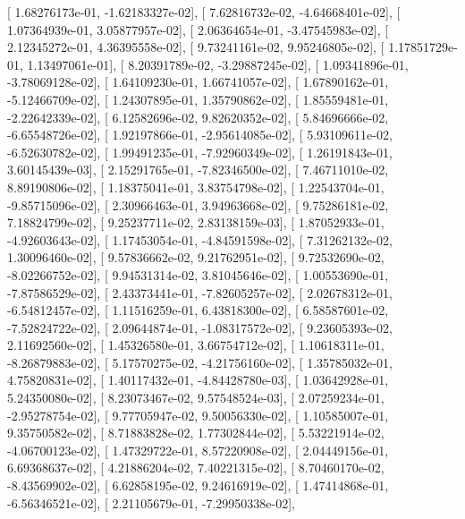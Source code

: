 \documentclass{article}
\begin{document}
       [  1.68276173e-01,  -1.62183327e-02],
       [  7.62816732e-02,  -4.64668401e-02],
       [  1.07364939e-01,   3.05877957e-02],
       [  2.06364654e-01,  -3.47545983e-02],
       [  2.12345272e-01,   4.36395558e-02],
       [  9.73241161e-02,   9.95246805e-02],
       [  1.17851729e-01,   1.13497061e-01],
       [  8.20391789e-02,  -3.29887245e-02],
       [  1.09341896e-01,  -3.78069128e-02],
       [  1.64109230e-01,   1.66741057e-02],
       [  1.67890162e-01,  -5.12466709e-02],
       [  1.24307895e-01,   1.35790862e-02],
       [  1.85559481e-01,  -2.22642339e-02],
       [  6.12582696e-02,   9.82620352e-02],
       [  5.84696666e-02,  -6.65548726e-02],
       [  1.92197866e-01,  -2.95614085e-02],
       [  5.93109611e-02,  -6.52630782e-02],
       [  1.99491235e-01,  -7.92960349e-02],
       [  1.26191843e-01,   3.60145439e-03],
       [  2.15291765e-01,  -7.82346500e-02],
       [  7.46711010e-02,   8.89190806e-02],
       [  1.18375041e-01,   3.83754798e-02],
       [  1.22543704e-01,  -9.85715096e-02],
       [  2.30966463e-01,   3.94963668e-02],
       [  9.75286181e-02,   7.18824799e-02],
       [  9.25237711e-02,   2.83138159e-03],
       [  1.87052933e-01,  -4.92603643e-02],
       [  1.17453054e-01,  -4.84591598e-02],
       [  7.31262132e-02,   1.30096460e-02],
       [  9.57836662e-02,   9.21762951e-02],
       [  9.72532690e-02,  -8.02266752e-02],
       [  9.94531314e-02,   3.81045646e-02],
       [  1.00553690e-01,  -7.87586529e-02],
       [  2.43373441e-01,  -7.82605257e-02],
       [  2.02678312e-01,  -6.54812457e-02],
       [  1.11516259e-01,   6.43818300e-02],
       [  6.58587601e-02,  -7.52824722e-02],
       [  2.09644874e-01,  -1.08317572e-02],
       [  9.23605393e-02,   2.11692560e-02],
       [  1.45326580e-01,   3.66754712e-02],
       [  1.10618311e-01,  -8.26879883e-02],
       [  5.17570275e-02,  -4.21756160e-02],
       [  1.35785032e-01,   4.75820831e-02],
       [  1.40117432e-01,  -4.84428780e-03],
       [  1.03642928e-01,   5.24350080e-02],
       [  8.23073467e-02,   9.57548524e-03],
       [  2.07259234e-01,  -2.95278754e-02],
       [  9.77705947e-02,   9.50056330e-02],
       [  1.10585007e-01,   9.35750582e-02],
       [  8.71883828e-02,   1.77302844e-02],
       [  5.53221914e-02,  -4.06700123e-02],
       [  1.47329722e-01,   8.57220908e-02],
       [  2.04449156e-01,   6.69368637e-02],
       [  4.21886204e-02,   7.40221315e-02],
       [  8.70460170e-02,  -8.43569902e-02],
       [  6.62858195e-02,   9.24616919e-02],
       [  1.47414868e-01,  -6.56346521e-02],
       [  2.21105679e-01,  -7.29950338e-02],
\end{document}
